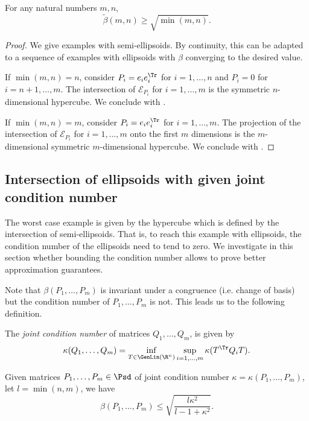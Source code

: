 \documentclass[11pt,twoside,a4paper,openright]{uclouvain-thesis}
\newcommand{\johnintm}{\beta}
\newcommand{\johnint}{\tilde{\johnintm}}
\begin{document}
\begin{mylem}
    For any natural numbers $m, n$,
    \[ \johnint(m, n) \ge \sqrt{\min(m, n)}. \]
    \begin{proof}
      We give examples with semi-ellipsoids.
      By continuity, this can be adapted to a sequence of examples with ellipsoids
      with $\johnintm$ converging to the desired value.

      If $\min(m, n) = n$, consider $P_i = e_ie_i^\Tr$ for $i = 1, \ldots, n$ and $P_i = 0$ for $i = n+1, \ldots, m$.
      The intersection of $\mathcal{E}_{P_i}$ for $i = 1, \ldots, m$ is the symmetric $n$-dimensional hypercube.
      We conclude with .

      If $\min(m, n) = m$, consider $P_i = e_ie_i^\Tr$ for $i = 1, \ldots, m$.
      The projection of the intersection of $\mathcal{E}_{P_i}$ for $i = 1, \ldots, m$ onto the first $m$ dimensions is the $m$-dimensional symmetric $m$-dimensional hypercube.
      We conclude with .
    \end{proof}
\end{mylem}

\subsection{Intersection of ellipsoids with given joint condition number}
The worst case example is given by the hypercube which is defined by the intersection of semi-ellipsoids.
That is, to reach this example with ellipsoids, the condition number of the ellipsoids need to tend to zero.
We investigate in this section whether bounding the condition number allows to prove better
approximation guarantees.

Note that $\johnintm(P_1, \ldots, P_m)$ is invariant under a congruence (i.e. change of basis) but
the condition number of $P_1, \ldots, P_m$ is not.
This leads us to the following definition.
\begin{mydef}
    \label{def:jcn}
    The \emph{joint condition number} of matrices $Q_1, \ldots, Q_m$, is given by
    \[ \kappa(Q_1, \ldots, Q_m) = \inf_{T \in \GenLin(\R^n)} \sup_{i=1,\ldots,m} \kappa(T^\Tr Q_i T). \]
\end{mydef}




\begin{myconj}
    \label{conj:jcn}
    Given matrices $P_1, \ldots, P_m \in \Psd$ of joint condition number
    $\kappa = \kappa(P_1, \ldots, P_m)$,
    let $l = \min(n, m)$, we have
    \[ \johnintm(P_1, \ldots, P_m) \leq \sqrt{\frac{l\kappa^2}{l-1+\kappa^2}}. \]
\end{myconj}
\end{document}
